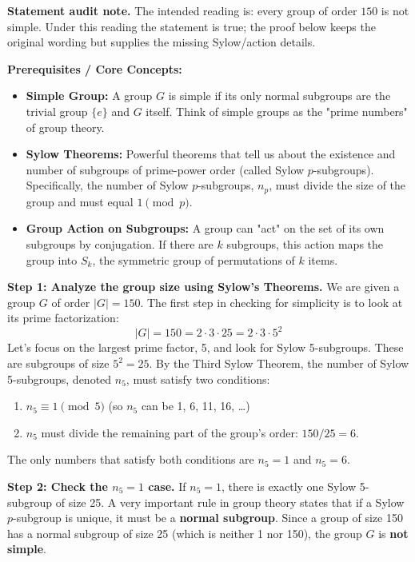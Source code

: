 \begin{solution}
\textbf{Statement audit note.}
The intended reading is: every group of order $150$ is not simple. Under this reading the statement is true; the proof below keeps the original wording but supplies the missing Sylow/action details.

\textbf{Prerequisites / Core Concepts:}
\begin{itemize}
    \item \textbf{Simple Group:} A group $G$ is simple if its only normal subgroups are the trivial group $\{e\}$ and $G$ itself. Think of simple groups as the "prime numbers" of group theory.
    \item \textbf{Sylow Theorems:} Powerful theorems that tell us about the existence and number of subgroups of prime-power order (called Sylow $p$-subgroups). Specifically, the number of Sylow $p$-subgroups, $n_p$, must divide the size of the group and must equal $1 \pmod p$.
    \item \textbf{Group Action on Subgroups:} A group can "act" on the set of its own subgroups by conjugation. If there are $k$ subgroups, this action maps the group into $S_k$, the symmetric group of permutations of $k$ items.
\end{itemize}

\textbf{Step 1: Analyze the group size using Sylow's Theorems.}
We are given a group $G$ of order $|G| = 150$. The first step in checking for simplicity is to look at its prime factorization:
\[ |G| = 150 = 2 \cdot 3 \cdot 25 = 2 \cdot 3 \cdot 5^2 \]
Let's focus on the largest prime factor, 5, and look for Sylow 5-subgroups. These are subgroups of size $5^2 = 25$.
By the Third Sylow Theorem, the number of Sylow 5-subgroups, denoted $n_5$, must satisfy two conditions:
\begin{enumerate}
    \item $n_5 \equiv 1 \pmod 5$ (so $n_5$ can be 1, 6, 11, 16, \dots)
    \item $n_5$ must divide the remaining part of the group's order: $150 / 25 = 6$.
\end{enumerate}

The only numbers that satisfy both conditions are $n_5 = 1$ and $n_5 = 6$.

\textbf{Step 2: Check the $n_5 = 1$ case.}
If $n_5 = 1$, there is exactly one Sylow 5-subgroup of size 25.
A very important rule in group theory states that if a Sylow $p$-subgroup is unique, it must be a \textbf{normal subgroup}.
Since a group of size 150 has a normal subgroup of size 25 (which is neither 1 nor 150), the group $G$ is \textbf{not simple}.


\end{solution}

